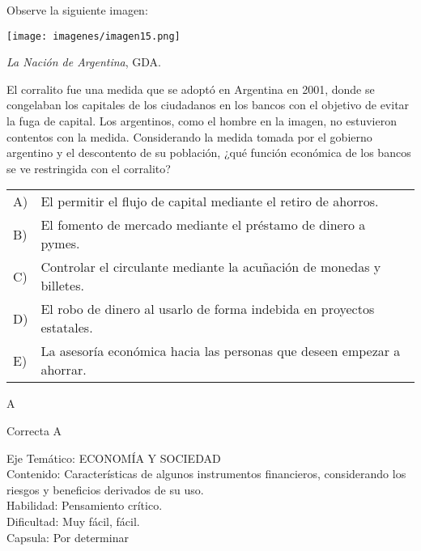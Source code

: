 \documentclass[letterpaper,11pt]{article}
\newcommand{\anchopregunta}{0.9\textwidth}
\begin{document}
\begin{enumerate}
\begin{minipage}{\anchopregunta}
\item Observe la siguiente imagen:
\begin{center}
    \texttt{[image: imagenes/imagen15.png]}
\end{center}
\begin{flushright}
\textit{La Nación de Argentina}, GDA.
\end{flushright}
El corralito fue una medida que se adoptó en Argentina en 2001, donde se congelaban los capitales de los ciudadanos en los bancos con el objetivo de evitar la fuga de capital. Los argentinos, como el hombre en la imagen, no estuvieron contentos con la medida. Considerando la medida tomada por el gobierno argentino y el descontento de su población, ¿qué función económica de los bancos se ve restringida con el corralito?
\begin{flushleft}\begin{tabular}{@{\hspace{-.001\textwidth}}l@{\hspace{2pt}}p{}}
A)& El permitir el flujo de capital mediante el retiro de ahorros.\\
B)& El fomento de mercado mediante el préstamo de dinero a pymes.\\
C)& Controlar el circulante mediante la acuñación de monedas y billetes.\\
D)& El robo de dinero al usarlo de forma indebida en proyectos estatales.\\
E)& La asesoría económica hacia las personas que deseen empezar a ahorrar.\\ 
\end{tabular}\end{flushleft}%
\begin{key} A
\end{key} 
\begin{hint}
\end{hint}
\begin{answer} Correcta A \\
\end{answer}
\begin{info} %
\begin{flushleft}
Eje Temático: ECONOMÍA Y SOCIEDAD\\
Contenido: Características de algunos instrumentos financieros, considerando los riesgos y beneficios derivados de su uso.\\
Habilidad: Pensamiento crítico.\\
Dificultad: Muy fácil, fácil.\\
Capsula: Por determinar \\
\end{flushleft} 
\end{info}
\end{minipage}\vfill$\;$ %


\end{enumerate}
\end{document}
